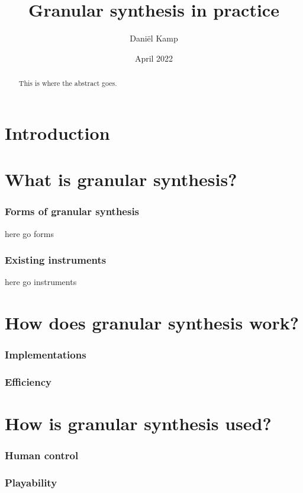 \documentclass[12pt, letterpaper]{article}
\title{Granular synthesis in practice}
\author{Daniël Kamp}
\date{April 2022}
\begin{document}
\maketitle

\begin{abstract}
This is where the abstract goes.
\end{abstract}

\part*{Introduction}

\part{What is granular synthesis?}
\section{Forms of granular synthesis}
here go forms
\section{Existing instruments}
here go instruments

\part{How does granular synthesis work?}
\section{Implementations}
\section{Efficiency}

\part{How is granular synthesis used?}
\section{Human control}
\section{Playability}
\end{document}
